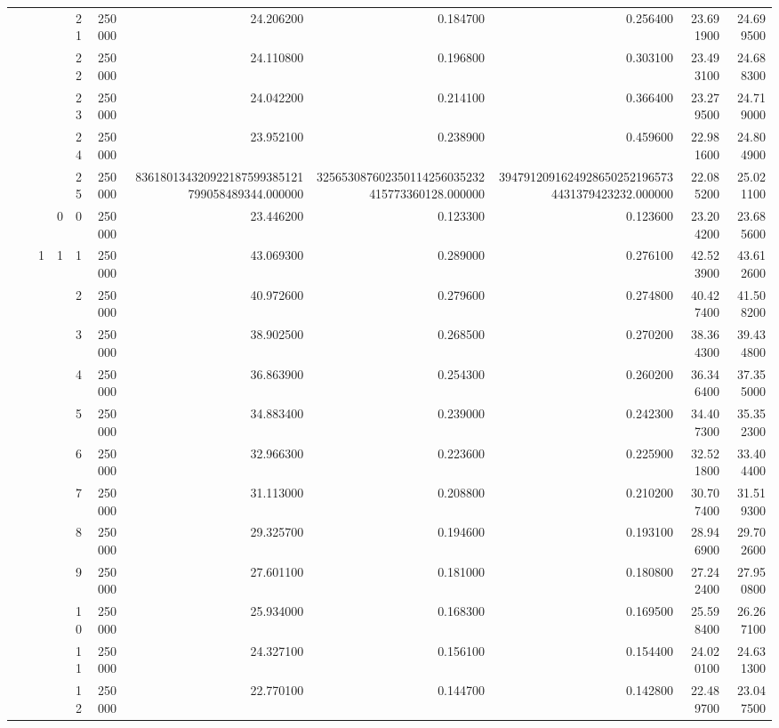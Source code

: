 \begin{tabular}{llllllrrrrr}
\cline{5-11}
 &  &  &  & 21 & 250000 & 24.206200 & 0.184700 & 0.256400 & 23.691900 & 24.699500 \\
\cline{5-11}
 &  &  &  & 22 & 250000 & 24.110800 & 0.196800 & 0.303100 & 23.493100 & 24.688300 \\
\cline{5-11}
 &  &  &  & 23 & 250000 & 24.042200 & 0.214100 & 0.366400 & 23.279500 & 24.719000 \\
\cline{5-11}
 &  &  &  & 24 & 250000 & 23.952100 & 0.238900 & 0.459600 & 22.981600 & 24.804900 \\
\cline{5-11}
 &  &  &  & 25 & 250000 & 836180134320922187599385121799058489344.000000 & 325653087602350114256035232415773360128.000000 & 39479120916249286502521965734431379423232.000000 & 22.085200 & 25.021100 \\
\cline{4-11} \cline{5-11}
 &  &  & 0 & 0 & 250000 & 23.446200 & 0.123300 & 0.123600 & 23.204200 & 23.685600 \\
\cline{3-11} \cline{4-11} \cline{5-11}
 &  & \multirow[t]{101}{*}{1} & \multirow[t]{25}{*}{1} & 1 & 250000 & 43.069300 & 0.289000 & 0.276100 & 42.523900 & 43.612600 \\
\cline{5-11}
 &  &  &  & 2 & 250000 & 40.972600 & 0.279600 & 0.274800 & 40.427400 & 41.508200 \\
\cline{5-11}
 &  &  &  & 3 & 250000 & 38.902500 & 0.268500 & 0.270200 & 38.364300 & 39.434800 \\
\cline{5-11}
 &  &  &  & 4 & 250000 & 36.863900 & 0.254300 & 0.260200 & 36.346400 & 37.355000 \\
\cline{5-11}
 &  &  &  & 5 & 250000 & 34.883400 & 0.239000 & 0.242300 & 34.407300 & 35.352300 \\
\cline{5-11}
 &  &  &  & 6 & 250000 & 32.966300 & 0.223600 & 0.225900 & 32.521800 & 33.404400 \\
\cline{5-11}
 &  &  &  & 7 & 250000 & 31.113000 & 0.208800 & 0.210200 & 30.707400 & 31.519300 \\
\cline{5-11}
 &  &  &  & 8 & 250000 & 29.325700 & 0.194600 & 0.193100 & 28.946900 & 29.702600 \\
\cline{5-11}
 &  &  &  & 9 & 250000 & 27.601100 & 0.181000 & 0.180800 & 27.242400 & 27.950800 \\
\cline{5-11}
 &  &  &  & 10 & 250000 & 25.934000 & 0.168300 & 0.169500 & 25.598400 & 26.267100 \\
\cline{5-11}
 &  &  &  & 11 & 250000 & 24.327100 & 0.156100 & 0.154400 & 24.020100 & 24.631300 \\
\cline{5-11}
 &  &  &  & 12 & 250000 & 22.770100 & 0.144700 & 0.142800 & 22.489700 & 23.047500 \\

\end{tabular}
